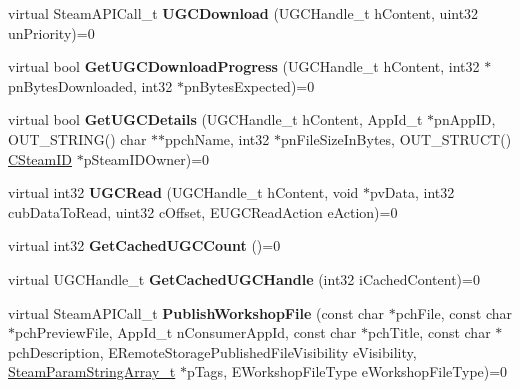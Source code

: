 \begin{DoxyCompactItemize}
virtual Steam\+A\+P\+I\+Call\+\_\+t {\bfseries U\+G\+C\+Download} (U\+G\+C\+Handle\+\_\+t h\+Content, uint32 un\+Priority)=0
\item 
\mbox{\label{class_i_steam_remote_storage_a9402ae508e9d3ab378b0314c26902857}} 
virtual bool {\bfseries Get\+U\+G\+C\+Download\+Progress} (U\+G\+C\+Handle\+\_\+t h\+Content, int32 $\ast$pn\+Bytes\+Downloaded, int32 $\ast$pn\+Bytes\+Expected)=0
\item 
\mbox{\label{class_i_steam_remote_storage_a924a56f17887db6c3dd0c4d9ba8c2642}} 
virtual bool {\bfseries Get\+U\+G\+C\+Details} (U\+G\+C\+Handle\+\_\+t h\+Content, App\+Id\+\_\+t $\ast$pn\+App\+ID, O\+U\+T\+\_\+\+S\+T\+R\+I\+NG() char $\ast$$\ast$ppch\+Name, int32 $\ast$pn\+File\+Size\+In\+Bytes, O\+U\+T\+\_\+\+S\+T\+R\+U\+CT() \hyperlink{class_c_steam_i_d}{C\+Steam\+ID} $\ast$p\+Steam\+I\+D\+Owner)=0
\item 
\mbox{\label{class_i_steam_remote_storage_a73d9a54a3d8499a131c5a6a6458d51ac}} 
virtual int32 {\bfseries U\+G\+C\+Read} (U\+G\+C\+Handle\+\_\+t h\+Content, void $\ast$pv\+Data, int32 cub\+Data\+To\+Read, uint32 c\+Offset, E\+U\+G\+C\+Read\+Action e\+Action)=0
\item 
\mbox{\label{class_i_steam_remote_storage_ac0d333da8fd008d449724882bb80a3df}} 
virtual int32 {\bfseries Get\+Cached\+U\+G\+C\+Count} ()=0
\item 
\mbox{\label{class_i_steam_remote_storage_ae12669aa7bce9279b5c25938bd350a0f}} 
virtual U\+G\+C\+Handle\+\_\+t {\bfseries Get\+Cached\+U\+G\+C\+Handle} (int32 i\+Cached\+Content)=0
\item 
\mbox{\label{class_i_steam_remote_storage_aff57828f414ca927cc35317271222c49}} 
virtual Steam\+A\+P\+I\+Call\+\_\+t {\bfseries Publish\+Workshop\+File} (const char $\ast$pch\+File, const char $\ast$pch\+Preview\+File, App\+Id\+\_\+t n\+Consumer\+App\+Id, const char $\ast$pch\+Title, const char $\ast$pch\+Description, E\+Remote\+Storage\+Published\+File\+Visibility e\+Visibility, \hyperlink{struct_steam_param_string_array__t}{Steam\+Param\+String\+Array\+\_\+t} $\ast$p\+Tags, E\+Workshop\+File\+Type e\+Workshop\+File\+Type)=0
$$
\end{DoxyCompactItemize}
